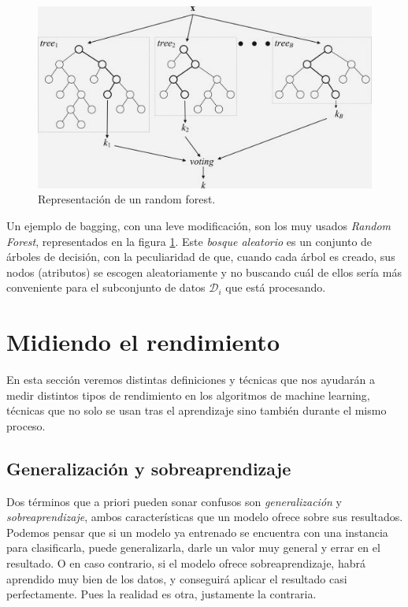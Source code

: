 \begin{figure}[ht]
  \centering
  \includegraphics[width=120mm]{figures/ch_03/random_forests_example.jpg}
  \caption{Representación de un random forest. \cite{harmati2014elvarazsolt}}
  \label{fig:3.6}
\end{figure}

Un ejemplo de bagging, con una leve modificación, son los muy usados \emph{Random Forest}, representados en la figura \ref{fig:3.6}. Este \emph{bosque aleatorio} es un conjunto de árboles de decisión, con la peculiaridad de que, cuando cada árbol es creado, sus nodos (atributos) se escogen aleatoriamente y no buscando cuál de ellos sería más conveniente para el subconjunto de datos $\mathcal{D}_{i}$ que está procesando.

\section{Midiendo el rendimiento} \label{sec:3.2}

En esta sección veremos distintas definiciones y técnicas que nos ayudarán a medir distintos tipos de rendimiento en los algoritmos de machine learning, técnicas que no solo se usan tras el aprendizaje sino también durante el mismo proceso.

\subsection{Generalización y sobreaprendizaje} \label{subsec:3.2.1}

Dos términos que a priori pueden sonar confusos son \emph{generalización} y \emph{sobreaprendizaje}, ambos características que un modelo ofrece sobre sus resultados. Podemos pensar que si un modelo ya entrenado se encuentra con una instancia para clasificarla, puede generalizarla, darle un valor muy general y errar en el resultado. O en caso contrario, si el modelo ofrece sobreaprendizaje, habrá aprendido muy bien de los datos, y conseguirá aplicar el resultado casi perfectamente. Pues la realidad es otra, justamente la contraria.


